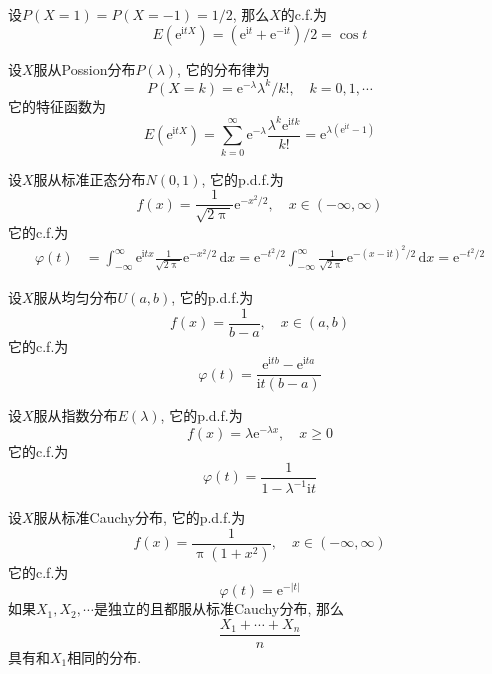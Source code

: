 \documentclass[cn, 12pt, math=mtpro2, bibstyle=apa, blue, twocol]{elegantbook}
\begin{document}
\begin{example}
设$P(X=1)=P(X=-1)=1/2$, 那么$X$的c.f.为
$$E(\text{e}^{\text{i}tX})=(\text{e}^{\text{i}t}+\text{e}^{-\text{i}t})/2=\cos t$$
\end{example}

\begin{example}
设$X$服从Possion分布$P(\lambda)$, 它的分布律为
$$P(X=k)=\text{e}^{-\lambda}\lambda^k/k!,\quad k=0,1,\cdots$$
它的特征函数为
$$E(\text{e}^{\text{i}tX})=\sum_{k=0}^{\infty}\text{e}^{-\lambda}\frac{\lambda^k\text{e}^{\text{i}tk}}{k!}=\text{e}^{\lambda(\text{e}^{\text{i}t}-1)}$$
\end{example}

\begin{example}
设$X$服从标准正态分布$N(0,1)$, 它的p.d.f.为
$$f(x)=\frac{1}{\sqrt{2\uppi}}\text{e}^{-x^2/2},\quad x\in(-\infty,\infty)$$
它的c.f.为
\begin{align*}
\varphi(t)&=\int_{-\infty}^{\infty}\text{e}^{\text{i}tx}\frac{1}{\sqrt{2\uppi}}\text{e}^{-x^2/2}\,\text{d}x=\text{e}^{-t^2/2}\int_{-\infty}^{\infty}\frac{1}{\sqrt{2\uppi}}\text{e}^{-(x-\text{i}t)^2/2}\,\text{d}x=\text{e}^{-t^2/2}\end{align*}
\end{example}

\begin{example}
设$X$服从均匀分布$U(a,b)$, 它的p.d.f.为
$$f(x)=\frac{1}{b-a},\quad x\in (a,b)$$
它的c.f.为
$$\varphi(t)=\frac{\text{e}^{\text{i}tb}-\text{e}^{\text{i}ta}}{\text{i}t(b-a)}$$
\end{example}

\begin{example}
设$X$服从指数分布$E(\lambda)$, 它的p.d.f.为
$$f(x)=\lambda\text{e}^{-\lambda x},\quad x\geq 0$$
它的c.f.为
$$\varphi(t)=\frac{1}{1-\lambda^{-1}\text{i}t}$$
\end{example}

\begin{example}
设$X$服从标准Cauchy分布, 它的p.d.f.为
$$f(x)=\frac{1}{\uppi(1+x^2)},\quad x\in(-\infty,\infty)$$
它的c.f.为
$$\varphi(t)=\text{e}^{-|t|}$$
如果$X_1,X_2,\cdots$是独立的且都服从标准Cauchy分布, 那么
$$\frac{X_1+\cdots+X_n}{n}$$
具有和$X_1$相同的分布.
\end{example}
\end{document}

